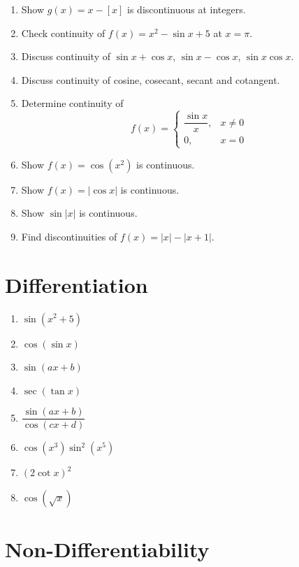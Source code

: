 \documentclass[12pt,a4paper]{article}
\begin{document}
\begin{enumerate}
\item Show $g(x)=x-[x]$ is discontinuous at integers.

\item Check continuity of $f(x)=x^2-\sin x+5$ at $x=\pi$.

\item Discuss continuity of $\sin x+\cos x$, $\sin x-\cos x$, $\sin x\cos x$.

\item Discuss continuity of cosine, cosecant, secant and cotangent.

\item Determine continuity of
\[
f(x)=
\begin{cases}
\dfrac{\sin x}{x},&x\neq0\\
0,&x=0
\end{cases}
\]

\item Show $f(x)=\cos(x^2)$ is continuous.

\item Show $f(x)=|\cos x|$ is continuous.

\item Show $\sin|x|$ is continuous.

\item Find discontinuities of $f(x)=|x|-|x+1|$.

\end{enumerate}

\section*{Differentiation}

\begin{enumerate}
\item $\sin(x^2+5)$
\item $\cos(\sin x)$
\item $\sin(ax+b)$
\item $\sec(\tan x)$
\item $\dfrac{\sin(ax+b)}{\cos(cx+d)}$
\item $\cos(x^3)\sin^2(x^5)$
\item $(2\cot x)^2$
\item $\cos(\sqrt{x})$
\end{enumerate}

\section*{Non-Differentiability}
\end{document}
